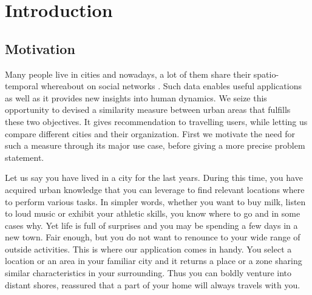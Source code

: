 \chapter{Introduction}
\label{ch:introduction}

\section{Motivation}

Many people live in cities and nowadays, a lot of them share their
spatio-temporal whereabout on social networks \autocite{SpatialComputing12}.
Such data enables useful applications as well as it provides new insights into
human dynamics. We seize this opportunity to devised a similarity measure
between urban areas that fulfills these two objectives. It gives
recommendation to travelling users, while letting us compare different cities
and their organization. First we motivate the need for such a measure through
its major use case, before giving a more precise problem statement.

\medskip

Let us say you have lived in a city for the last years. During this time, you
have acquired urban knowledge that you can leverage to find relevant locations
where to perform various tasks. In simpler words, whether you want to buy
milk, listen to loud music or exhibit your athletic skills, you know where to
go and in some cases why. Yet life is full of surprises and you may be
spending a few days in a new town. Fair enough, but you do not want to
renounce to your wide range of outside activities. This is where our
application comes in handy. You select a location or an area in your familiar
city and it returns a place or a zone sharing similar characteristics in your
surrounding. Thus you can boldly venture into distant shores, reassured that a
part of your home will always travels with you.

